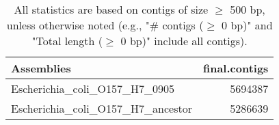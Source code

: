 \documentclass[12pt,a4paper]{article}
\begin{document}
\begin{table}[ht]
\begin{center}
\caption{All statistics are based on contigs of size $\geq$ 500 bp, unless otherwise noted (e.g., "\# contigs ($\geq$ 0 bp)" and "Total length ($\geq$ 0 bp)" include all contigs).}
\begin{tabular}{|l*{1}{|r}|}
\hline
Assemblies & final.contigs \\ \hline
Escherichia\_coli\_O157\_H7\_0905 & 5694387 \\ \hline
Escherichia\_coli\_O157\_H7\_ancestor & 5286639 \\ \hline
\end{tabular}
\end{center}
\end{table}
\end{document}
